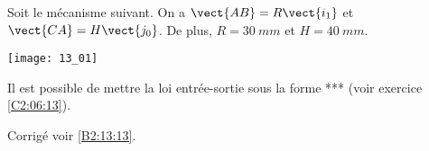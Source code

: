 \normaltrue \difficilefalse \tdifficilefalse
\correctionfalse


\setcounter{question}{0}
\ifcorrection
\else
{}
\fi

\ifprof
\else
Soit le mécanisme suivant. On a $\vect{AB}=R\vect{i_1}$ et $\vect{CA}=H\vect{j_0}$. De plus, 
$R=\SI{30}{mm}$ et $H=\SI{40}{mm}$. 

\begin{center}
\texttt{[image: 13\_01]}
\end{center}
\fi

Il est possible de mettre la loi entrée-sortie sous la forme *** (voir exercice \ref{C2:06:13}).

\ifprof
\else
\fi

\ifprof
\else
\fi

\ifprof
\else
\begin{flushright}
\footnotesize{Corrigé  voir \ref{B2:13:13}.}
\end{flushright}%
\fi